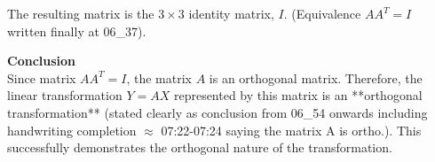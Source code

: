 \documentclass{article}
\begin{document}
The resulting matrix is the $3 \times 3$ identity matrix, $I$. (Equivalence $AA^T = I$ written finally at 06\_37).

\textbf{ Conclusion } \\
Since matrix $A A^T = I$, the matrix $A$ is an orthogonal matrix. Therefore, the linear transformation $Y=AX$ represented by this matrix is an **orthogonal transformation** (stated clearly as conclusion from 06\_54 onwards including handwriting completion $\approx$ 07:22-07:24 saying the matrix A is ortho.). This successfully demonstrates the orthogonal nature of the transformation.
\end{document}
